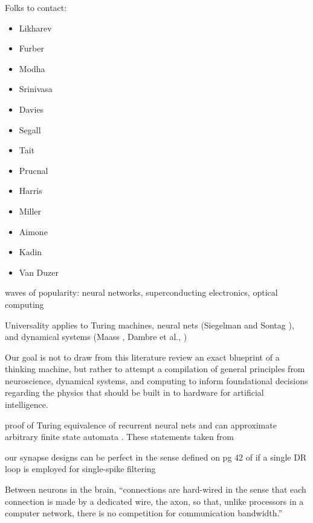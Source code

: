 \vspace{3em}
Folks to contact:
\begin{itemize} 
\item Likharev
\item Furber
\item Modha
\item Srinivasa
\item Davies
\item Segall
\item Tait
\item Prucnal
\item Harris
\item Miller
\item Aimone
\item Kadin
\item Van Duzer
\end{itemize}
	
\vspace{3em}
waves of popularity: neural networks, superconducting electronics, optical computing	
	
\vspace{3em}
Universality applies to Turing machines, neural nets (Siegelman and Sontag \cite{siso1991}), and dynamical systems (Maass \cite{}, Dambre et al., \cite{dave2012})	

\vspace{3em}
Our goal is not to draw from this literature review an exact blueprint of a thinking machine, but rather to attempt a compilation of general principles from neuroscience, dynamical systems, and computing to inform foundational decisions regarding the physics that should be built in to hardware for artificial intelligence.





\vspace{3em}
proof of Turing equivalence of recurrent neural nets \cite{kisi1996} and can approximate arbitrary finite state automata \cite{omgi1994}. These statements taken from \cite{vesc2007}

\vspace{3em}
our synapse designs can be perfect in the sense defined on pg 42 of \cite{li1997} if a single DR loop is employed for single-spike filtering

\vspace{3em}
Between neurons in the brain, ``connections are hard-wired in the sense that each connection is made by a dedicated wire, the axon, so that, unlike processors in a computer network, there is no competition for communication bandwidth.'' \cite{ko1997}

